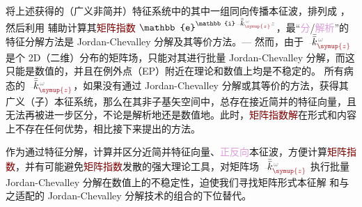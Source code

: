 将上述获得的（广义非简并）\textcolor{PineGreen}{特征系统}中的其中一组同向传播\textcolor{PineGreen}{本征波}，排列成 \cite{borzdovWavesLinearQuadratic1996}，然后利用  辅助计算其\textcolor{Maroon}{矩阵指数} $\mathbb{e}^{\mathbb{i} \Xint{\begin{smallmatrix} ~ \\ {}^{}_{\mathcolor{gray}{-}} \\ ~ \end{smallmatrix}}{15}{\bar{\bar{k}}}_{\textcolor{Maroon}{\symup{z}}}^{\;\! \mathcolor{gray}{\omega}} \mathcolor{gray}{z}}$，最“\textcolor{Plum}{分}/\textcolor{Plum}{解析}”的特征分解方法是 \textcolor{PineGreen}{Jordan-Chevalley 分解}及其等价方法。--- 然而，由于 $\Xint{\begin{smallmatrix} ~ \\ {}^{}_{\mathcolor{gray}{-}} \\ ~ \end{smallmatrix}}{15}{\bar{\bar{k}}}_{\textcolor{Maroon}{\symup{z}}}^{\;\! \mathcolor{gray}{\omega}}$ 是个 2D（二维）分布的矩阵场，只能对其进行批量 \textcolor{PineGreen}{Jordan-Chevalley 分解}，而这只能是数值的，并且在\textcolor{PineGreen}{例外点}（\textcolor{PineGreen}{EP}）附近在理论和数值上均是不稳定的\cite{molerNineteenDubiousWays2003}。{\four} 所有病态的 $\Xint{\begin{smallmatrix} ~ \\ {}^{}_{\mathcolor{gray}{-}} \\ ~ \end{smallmatrix}}{15}{\bar{\bar{k}}}_{\textcolor{Maroon}{\symup{z}}}^{\;\! \mathcolor{gray}{\omega}}$，如果没有通过 \textcolor{PineGreen}{Jordan-Chevalley 分解}或其等价的方法，获得其广义（子）\textcolor{PineGreen}{本征系统}，那么在其非子基矢空间中，总存在接近简并的\textcolor{PineGreen}{特征向量}，且无法再被进一步区分，不论是解析地还是数值地。此时，\textcolor{Maroon}{矩阵指数解}在形式和内容上不存在任何优势\cite{berremanOpticsStratifiedAnisotropic1972,stallingaBerreman4x4Matrix1999}，相比接下来提出的方法。

作为通过特征分解，计算并区分近简并\textcolor{PineGreen}{特征向量}、\textcolor{Plum}{正反向}\textcolor{PineGreen}{本征波}，方便计算\textcolor{Maroon}{矩阵指数}，并有可能避免\textcolor{Maroon}{矩阵指数}发散的强大理论工具，对矩阵场 $\Xint{\begin{smallmatrix} ~ \\ {}^{}_{\mathcolor{gray}{-}} \\ ~ \end{smallmatrix}}{15}{\bar{\bar{k}}}_{\textcolor{Maroon}{\symup{z}}}^{\;\! \mathcolor{gray}{\omega}}$ 执行批量 \textcolor{PineGreen}{Jordan-Chevalley 分解}在数值上的不稳定性\cite{molerNineteenDubiousWays2003}，迫使我们寻找矩阵形式\textcolor{PineGreen}{本征解}  和与之适配的 \textcolor{PineGreen}{Jordan-Chevalley 分解}技术的组合的下位替代。

